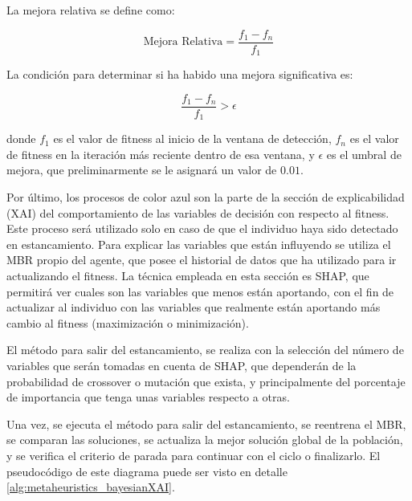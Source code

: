 La mejora relativa se define como:

\[
\text{Mejora Relativa} = \frac{f_1 - f_n}{f_1}
\label{ec:mejora_relativa_1}
\]

La condición para determinar si ha habido una mejora significativa es:

\[
\frac{f_1 - f_n}{f_1} > \epsilon
\label{ec:mejora_relativa_2}
\]

donde \( f_1 \) es el valor de fitness al inicio de la ventana de detección, \( f_n \) es el valor de fitness en la iteración más reciente dentro de esa ventana, y \(\epsilon\) es el umbral de mejora, que preliminarmente se le asignará un valor de $0.01$.

Por último, los procesos de color azul son la parte de la sección de explicabilidad (XAI) del comportamiento de las variables de decisión con respecto al fitness. Este proceso será utilizado solo en caso de que el individuo haya sido detectado en estancamiento. Para explicar las variables que están influyendo se utiliza el MBR propio del agente, que posee el historial de datos que ha utilizado para ir actualizando el fitness. La técnica empleada en esta sección es SHAP, que permitirá ver cuales son las variables que menos están aportando, con el fin de actualizar al individuo con las variables que realmente están aportando más cambio al fitness (maximización o minimización).

El método para salir del estancamiento, se realiza con la selección del número de variables que serán tomadas en cuenta de SHAP, que dependerán de la probabilidad de crossover o mutación que exista, y principalmente del porcentaje de importancia que tenga unas variables respecto a otras.

Una vez, se ejecuta el método para salir del estancamiento, se reentrena el MBR, se comparan las soluciones, se actualiza la mejor solución global de la población, y se verifica el criterio de parada para continuar con el ciclo o finalizarlo. El pseudocódigo de este diagrama puede ser visto en detalle \ref{alg:metaheuristics_bayesianXAI}.



